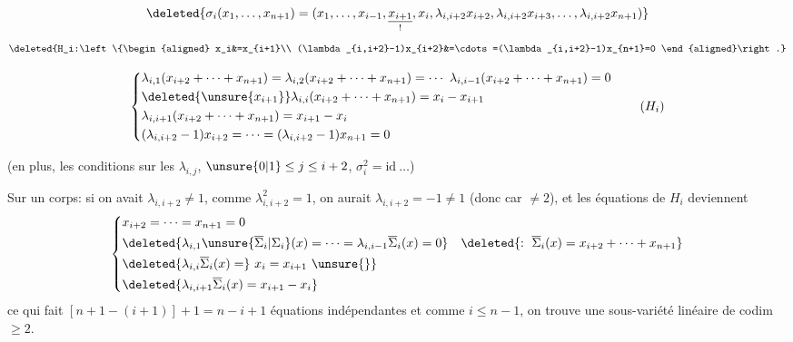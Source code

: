 \[
\deleted{\sigma_i(x_1,\ldots,x_{n+1})=(x_1,\ldots,x_{i-1},\underset{!}{\underline{x_{i+1}}},x_i,\lambda_{i,i+2}x_{i+2},\lambda_{i,i+2}x_{i+3},\ldots,\lambda_{i,i+2}x_{n+1})}
\]
\[
\deleted{H_i:\left\{\begin{aligned}
x_i&=x_{i+1}\\
(\lambda_{i,i+2}-1)x_{i+2}&=\cdots=(\lambda_{i,i+2}-1)x_{n+1}=0
\end{aligned}\right.}
\]

\[
\left\{\begin{aligned}
&\lambda_{i,1}(x_{i+2}+\cdots+x_{n+1})=\lambda_{i,2}(x_{i+2}+\cdots+x_{n+1})=\cdots\ \lambda_{i,i-1}(x_{i+2}+\cdots+x_{n+1})=0\\
&\deleted{\unsure{x_{i+1}}}\lambda_{i,i}(x_{i+2}+\cdots+x_{n+1})=x_i-x_{i+1}\\
&\lambda_{i,i+1}(x_{i+2}+\cdots+x_{n+1})=x_{i+1}-x_i\\
&(\lambda_{i,i+2}-1)x_{i+2}=\cdots=(\lambda_{i,i+2}-1)x_{n+1}=0
\end{aligned}\right.\tag*{$(H_i)$}
\]

(en plus, les conditions sur les $\lambda_{i,j}$, $\unsure{0|1}\leq j\leq i+2$,   $\sigma_i^2=\mathrm{id}\ \ldots$)

 Sur un corps: si on avait $\lambda_{i,i+2}\ne1$, comme $\lambda_{i,i+2}^2=1$, on aurait $\lambda_{i,i+2}=-1\ne1$ (donc car $\ne2$), et les équations de $H_i$ deviennent
\[
\left\{\begin{aligned}
&x_{i+2}=\cdots=x_{n+1}=0\\
&\deleted{\lambda_{i,1}\unsure{\overline{\Sigma}_i|\Sigma_i}(x)=\cdots=\lambda_{i,i-1}\overline{\Sigma}_i(x)=0}\quad\deleted{:\ \overline{\Sigma}_i(x)=x_{i+2}+\cdots+x_{n+1}}\\
&\deleted{\lambda_{i,i}\overline{\Sigma}_i(x)=}\ x_i=x_{i+1}\ \unsure{\}}\\
&\deleted{\lambda_{i,i+1}\overline{\Sigma}_i(x)=x_{i+1}-x_i}
\end{aligned}\right.
\]
ce qui fait $[n+1-(i+1)]+1=n-i+1$ équations  indépendantes et comme $i\leq n-1$, on trouve une sous-variété linéaire de codim $\geq2$.

